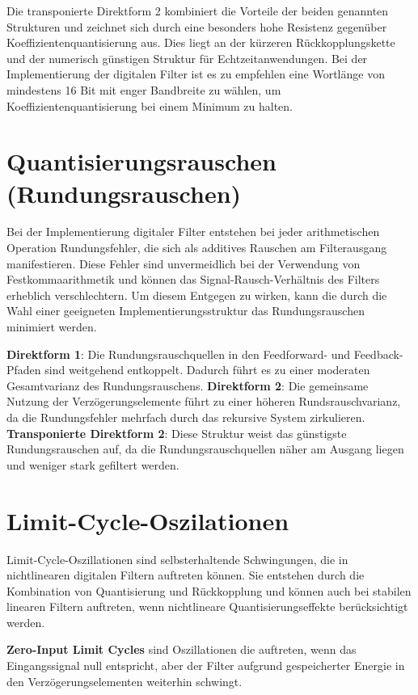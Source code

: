 \documentclass[
  ngerman,
  letterpaper,
  DIV=11]{scrreprt}
\begin{document}
Die transponierte Direktform 2 kombiniert die Vorteile der beiden
genannten Strukturen und zeichnet sich durch eine besonders hohe
Resistenz gegenüber Koeffizientenquantisierung aus. Dies liegt an der
kürzeren Rückkopplungskette und der numerisch günstigen Struktur für
Echtzeitanwendungen. Bei der Implementierung der digitalen Filter ist es
zu empfehlen eine Wortlänge von mindestens 16 Bit mit enger Bandbreite
zu wählen, um Koeffizientenquantisierung bei einem Minimum zu halten.

\section{Quantisierungsrauschen
(Rundungsrauschen)}\label{quantisierungsrauschen-rundungsrauschen}

Bei der Implementierung digitaler Filter entstehen bei jeder
arithmetischen Operation Rundungsfehler, die sich als additives Rauschen
am Filterausgang manifestieren. Diese Fehler sind unvermeidlich bei der
Verwendung von Festkommaarithmetik und können das
Signal-Rausch-Verhältnis des Filters erheblich verschlechtern. Um diesem
Entgegen zu wirken, kann die durch die Wahl einer geeigneten
Implementierungsstruktur das Rundungsrauschen minimiert werden.

\textbf{Direktform 1}: Die Rundungsrauschquellen in den Feedforward- und
Feedback-Pfaden sind weitgehend entkoppelt. Dadurch führt es zu einer
moderaten Gesamtvarianz des Rundungsrauschens. \textbf{Direktform 2}:
Die gemeinsame Nutzung der Verzögerungselemente führt zu einer höheren
Rundsrauschvarianz, da die Rundungsfehler mehrfach durch das rekursive
System zirkulieren. \textbf{Transponierte Direktform 2}: Diese Struktur
weist das günstigste Rundungsrauschen auf, da die Rundungsrauschquellen
näher am Ausgang liegen und weniger stark gefiltert werden.

\section{Limit-Cycle-Oszilationen}\label{limit-cycle-oszilationen}

Limit-Cycle-Oszillationen sind selbsterhaltende Schwingungen, die in
nichtlinearen digitalen Filtern auftreten können. Sie entstehen durch
die Kombination von Quantisierung und Rückkopplung und können auch bei
stabilen linearen Filtern auftreten, wenn nichtlineare
Quantisierungseffekte berücksichtigt werden.

\textbf{Zero-Input Limit Cycles} sind Oszillationen die auftreten, wenn
das Eingangssignal null entspricht, aber der Filter aufgrund
gespeicherter Energie in den Verzögerungselementen weiterhin schwingt.
\end{document}
